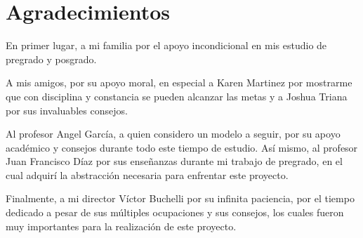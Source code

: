 \section*{Agradecimientos}

En primer lugar, a mi familia por el apoyo incondicional en mis estudio de pregrado y posgrado.

A mis amigos, por su apoyo moral, en especial a Karen Martinez por mostrarme que con disciplina y constancia se pueden alcanzar las metas y a Joshua Triana por sus invaluables consejos.

Al profesor Angel García, a quien considero un modelo a seguir, por su apoyo académico y consejos durante todo este tiempo de estudio. Así mismo, al profesor Juan Francisco Díaz por sus enseñanzas durante mi trabajo de pregrado, en el cual adquirí la abstracción necesaria para enfrentar este proyecto.

Finalmente, a mi director Víctor Buchelli por su infinita paciencia, por el tiempo dedicado a pesar de sus múltiples ocupaciones y sus consejos, los cuales fueron muy importantes para la realización de este proyecto.